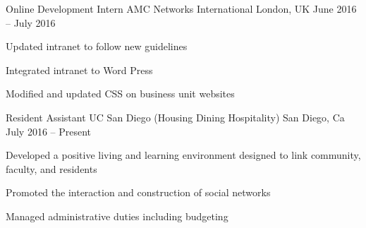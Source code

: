 \documentclass[]{awesome-cv}
\begin{document}
\vspace{-5mm}
\begin{cventries}
	\cventry
	{Online Development Intern}
	{AMC Networks International}
	{London, UK}
	{June 2016 – July 2016}
	{\begin{cvitems}
		\item {Updated intranet to follow new guidelines}
		\item {Integrated intranet to Word Press}
		\item {Modified and updated CSS on business unit websites}
		\end{cvitems}}
	\cventry
	{Resident Assistant}
	{UC San Diego (Housing Dining Hospitality)}
	{San Diego, Ca}
	{July 2016 – Present}
	{\begin{cvitems}
		\item {Developed a positive living and learning environment designed to link community, faculty, and residents}
		\item {Promoted the interaction and construction of social networks}
		\item {Managed administrative duties including budgeting}
		\end{cvitems}}
\end{cventries}
\end{document}
